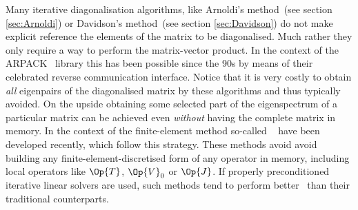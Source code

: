 Many iterative diagonalisation algorithms,
like Arnoldi's method~(see section \ref{sec:Arnoldi})
or Davidson's method~(see section \ref{sec:Davidson})
do not make explicit reference the elements of the matrix to be diagonalised.
Much rather they only require a way to perform the matrix-vector product.
In the context of the ARPACK~\cite{Lehoucq1998} library
this has been possible since the 90s
by means of their celebrated reverse communication interface.
Notice that it is very costly
to obtain \emph{all} eigenpairs of the diagonalised matrix
by these algorithms
and thus typically avoided.
On the upside obtaining some selected part of the eigenspectrum
of a particular matrix
can be achieved even \emph{without} having the complete matrix in memory.
In the context of the finite-element method
so-called ~\cite{Kronbichler2012}
have been developed recently,
which follow this strategy.
These methods avoid avoid building
any finite-element-discretised form of any operator in memory,
including local operators like $\Op{T}$, $\Op{V}_0$ or $\Op{J}$.
If properly preconditioned iterative linear solvers are used,
such methods tend to perform better~\cite{Kronbichler2012}
than their traditional counterparts.


